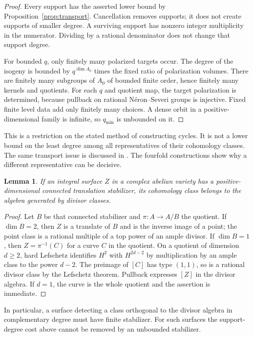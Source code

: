 \documentclass[11pt]{article}
\newtheorem{lemma}[theorem]{Lemma}
\theoremstyle{definition}
\theoremstyle{remark}
\begin{document}
\begin{proof}
Every support has the asserted lower bound by Proposition~\ref{prop:transport}. Cancellation removes supports; it does not create supports of smaller degree. A surviving support has nonzero integer multiplicity in the numerator. Dividing by a rational denominator does not change that support degree.

For bounded $q$, only finitely many polarized targets occur. The degree of the isogeny is bounded by $q^{\dim A_0}$ times the fixed ratio of polarization volumes. There are finitely many subgroups of $A_0$ of bounded finite order, hence finitely many kernels and quotients. For each $q$ and quotient map, the target polarization is determined, because pullback on rational N\'eron--Severi groups is injective. Fixed finite level data add only finitely many choices. A dense orbit in a positive-dimensional family is infinite, so $q_{\min}$ is unbounded on it.
\end{proof}

This is a restriction on the stated method of constructing cycles. It is not a lower bound on the least degree among all representatives of their cohomology classes. The same transport issue is discussed in \cite{BBAlgebraic}. The fourfold constructions show why a different representative can be decisive.

\begin{lemma}\label{lem:surface-stabilizer}
If an integral surface $Z$ in a complex abelian variety has a positive-dimensional connected translation stabilizer, its cohomology class belongs to the algebra generated by divisor classes.
\end{lemma}

\begin{proof}
Let $B$ be that connected stabilizer and $\pi:A\to A/B$ the quotient. If $\dim B=2$, then $Z$ is a translate of $B$ and is the inverse image of a point; the point class is a rational multiple of a top power of an ample divisor. If $\dim B=1$, then $Z=\pi^{-1}(C)$ for a curve $C$ in the quotient. On a quotient of dimension $d\geq2$, hard Lefschetz identifies $H^2$ with $H^{2d-2}$ by multiplication by an ample class to the power $d-2$. The preimage of $[C]$ has type $(1,1)$, so is a rational divisor class by the Lefschetz theorem. Pullback expresses $[Z]$ in the divisor algebra. If $d=1$, the curve is the whole quotient and the assertion is immediate.
\end{proof}

In particular, a surface detecting a class orthogonal to the divisor algebra in complementary degree must have finite stabilizer. For such surfaces the support-degree cost above cannot be removed by an unbounded stabilizer.
\end{document}
